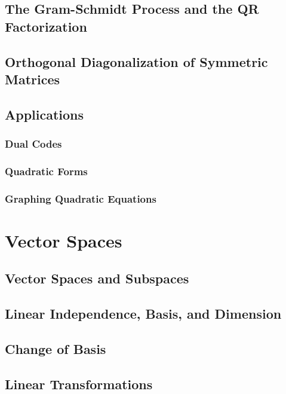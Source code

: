 \documentclass{article}
\begin{document}
	\subsection{The Gram-Schmidt Process and the QR Factorization}
	
	\subsection{Orthogonal Diagonalization of Symmetric Matrices}
	
	\subsection{Applications}
	
		\subsubsection{Dual Codes}
		\subsubsection{Quadratic Forms}
		\subsubsection{Graphing Quadratic Equations}

\clearpage	
\section{Vector Spaces} %

	\subsection{Vector Spaces and Subspaces}
	
	\subsection{Linear Independence, Basis, and Dimension}
	
	\subsection{Change of Basis}
	
	\subsection{Linear Transformations}
	
\end{document}
